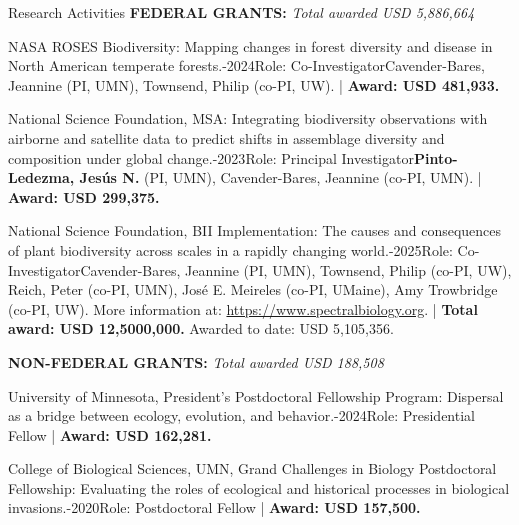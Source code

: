 \documentclass{resume} %
\begin{document}
\begin{rSection}{Research Activities}
\textbf{FEDERAL GRANTS:} \hfill {\em Total awarded USD 5,886,664}

\begin{pSubsection}{NASA ROSES Biodiversity: }{\normalfont Mapping changes in forest diversity and disease in North American temperate forests.}{-2024}{\normalfont Role: Co-Investigator}{\normalfont Cavender-Bares, Jeannine (PI, UMN), Townsend, Philip (co-PI, UW). | {\bf Award: USD 481,933.}}
\end{pSubsection}

\begin{pSubsection}{National Science Foundation, MSA: }{\normalfont Integrating biodiversity observations with airborne and satellite data to predict shifts in assemblage diversity and composition under global change.}{-2023}{\normalfont Role: Principal Investigator}{}{{\bf Pinto-Ledezma, Jesús N.} \normalfont (PI, UMN), Cavender-Bares, Jeannine (co-PI, UMN). | {\bf Award: USD 299,375.}}
\end{pSubsection}

\begin{pSubsection}{National Science Foundation, BII Implementation: }{\normalfont The causes and consequences of plant biodiversity across scales in a rapidly changing world.}{-2025}{\normalfont Role: Co-Investigator}{\normalfont Cavender-Bares, Jeannine (PI, UMN), Townsend, Philip (co-PI, UW), Reich, Peter (co-PI, UMN), José E. Meireles (co-PI, UMaine), Amy Trowbridge (co-PI, UW). More information at: \url{https://www.spectralbiology.org}. | {\bf Total award: USD 12,5000,000.} Awarded to date: USD 5,105,356.}
\end{pSubsection}

\textbf{NON-FEDERAL GRANTS:}  \hfill {\em Total awarded USD 188,508}

\begin{pSubsection}{University of Minnesota, President's Postdoctoral Fellowship Program: }{\normalfont Dispersal as a bridge between ecology, evolution, and behavior.}{-2024}{\normalfont Role: Presidential Fellow}{ | {\bf Award: USD 162,281.}}
\end{pSubsection}

\begin{pSubsection}{College of Biological Sciences, UMN, Grand Challenges in Biology Postdoctoral Fellowship: }{\normalfont Evaluating the roles of ecological and historical processes in biological invasions.}{-2020}{\normalfont Role: Postdoctoral Fellow}{ | {\bf Award: USD 157,500.}}
\end{pSubsection}


\end{rSection}
\end{document}

